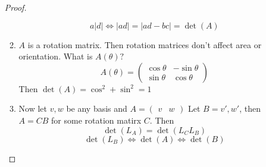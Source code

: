 \documentclass{article}
\newtheorem{one minute paper}[theorem]{One Minute Paper}
\begin{document}
\begin{enumerate}
\begin{proof}
\begin{enumerate}
\begin{equation}
                a|d| \iff |ad| = |ad - bc| = \det(A)
            \end{equation}
            \item $A$ is a rotation matrix. Then rotation matrices don't affect area or orientation. What is $A(\theta)?$
            \begin{equation}
                A(\theta) = \begin{pmatrix}
                    \cos\theta & -\sin\theta \\
                    \sin\theta & \cos\theta 
                \end{pmatrix}
            \end{equation} 
            Then $\det(A) = \cos^2 + \sin^2 = 1$
            \item Now let ${v,w}$ be any basis and $A = \begin{pmatrix}
                v & w
            \end{pmatrix}$ Let $B = {v', w'}$, then $A = CB$ for some rotation matirx $C$. Then 
            \begin{equation}
                \det(L_A) = \det(L_CL_B)
            \end{equation}
            \begin{equation}
                \det(L_B) \iff \det(A) \iff \det(B)
            \end{equation}
        \end{enumerate}
    \end{proof}
\end{enumerate}
\end{document}
